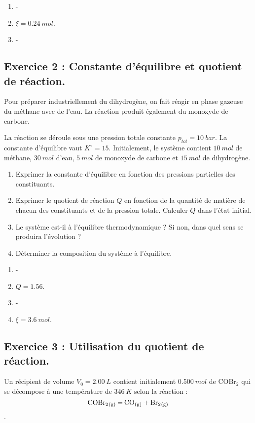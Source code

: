 \begin{enumerate}
	\item -
	\item $\xi = \SI{0.24}{mol}$.
	\item - 
\end{enumerate}

\subsection{Exercice 2 : Constante d'équilibre et quotient de réaction.}

Pour préparer industriellement du dihydrogène, on fait réagir en phase gazeuse du méthane avec de l'eau. La réaction produit également du monoxyde de carbone.

La réaction se déroule sous une pression totale constante $p_{tot} = \SI{10}{bar}$. La constante d'équilibre vaut $K^\circ = 15$. Initialement, le système contient $\SI{10}{mol}$ de méthane, $\SI{30}{mol}$ d'eau, $\SI{5}{mol}$ de monoxyde de carbone et $\SI{15}{mol}$ de dihydrogène. 

\begin{enumerate}
	\item Exprimer la constante d'équilibre en fonction des pressions partielles des constituants.
	\item Exprimer le quotient de réaction $Q$ en fonction de la quantité de matière de chacun des constituants et de la pression totale. Calculer $Q$ dans l'état initial.
	\item Le système est-il à l'équilibre thermodynamique ? Si non, dans quel sens se produira l'évolution ?
	\item Déterminer la composition du système à l'équilibre.
\end{enumerate}

\begin{enumerate}
	\item -
	\item $Q = 1.56$.
	\item -
	\item $\xi = \SI{3.6}{mol}$.
\end{enumerate}

\subsection{Exercice 3 : Utilisation du quotient de réaction.}

Un récipient de volume $V_0 = \SI{2.00}{L}$ contient initialement $\SI{0.500}{mol}$ de COBr$_2$ qui se décompose à une température de $\SI{346}{K}$ selon la réaction : $$\ce{COBr2_{(g)} = CO_{(g)} + Br2_{(g)}}$$.

